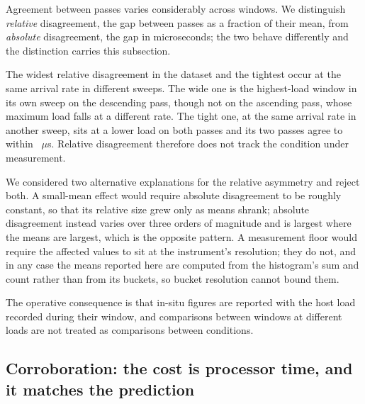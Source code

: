 \documentclass[pdflatex,sn-basic,twocolumn]{sn-jnl}%
\providecommand{\DIFaddbegin}{} %
\providecommand{\DIFaddend}{} %
\providecommand{\DIFdelbegin}{} %
\providecommand{\DIFdelend}{} %
\newcommand{\DIFscaledelfig}{0.5}
\newlength{\DIFdelgraphicswidth} %
\newlength{\DIFdelgraphicsheight} %
\newcommand{\DIFaddincludegraphics}[2][]{{\color{blue}\fbox{\DIFOincludegraphics[#1]{#2}}}} %
\newcommand{\DIFdelincludegraphics}[2][]{%
\sbox{\DIFdelgraphicsbox}{\DIFOincludegraphics[#1]{#2}}%
\settoboxwidth{\DIFdelgraphicswidth}{\DIFdelgraphicsbox} %
\settoboxtotalheight{\DIFdelgraphicsheight}{\DIFdelgraphicsbox} %
\scalebox{\DIFscaledelfig}{%
\parbox[b]{\DIFdelgraphicswidth}{\usebox{\DIFdelgraphicsbox}\\[-\baselineskip] \rule{\DIFdelgraphicswidth}{0em}}\llap{\resizebox{\DIFdelgraphicswidth}{\DIFdelgraphicsheight}{%
\setlength{\unitlength}{\DIFdelgraphicswidth}%
\begin{picture}(1,1)%
\thicklines\linethickness{2pt} %
{\color[rgb]{1,0,0}\put(0,0){\framebox(1,1){}}}%
{\color[rgb]{1,0,0}\put(0,0){\line( 1,1){1}}}%
{\color[rgb]{1,0,0}\put(0,1){\line(1,-1){1}}}%
\end{picture}%
}\hspace*{3pt}}} %
} %
\DeclareRobustCommand{\DIFaddbegin}{\DIFOaddbegin \let\includegraphics\DIFaddincludegraphics} %
\DeclareRobustCommand{\DIFaddend}{\DIFOaddend \let\includegraphics\DIFOincludegraphics} %
\DeclareRobustCommand{\DIFdelbegin}{\DIFOdelbegin \let\includegraphics\DIFdelincludegraphics} %
\DeclareRobustCommand{\DIFdelend}{\DIFOaddend \let\includegraphics\DIFOincludegraphics} %
\begin{document}
Agreement between passes varies considerably across windows. We distinguish
\emph{relative} disagreement, the gap between passes as a fraction of their mean,
from \emph{absolute} disagreement, the gap in microseconds; the two behave
differently and the distinction carries this subsection.

The widest relative disagreement in the dataset and the tightest occur at the same
arrival rate in different sweeps. The wide one is the highest-load window in its
own sweep on the descending pass, though not on the ascending pass, whose maximum
load falls at a different rate. The tight one, at the same arrival rate in another
sweep, sits at a lower load on both passes and its two passes agree to within
\InsituTightestAgreement~$\mu$s. Relative disagreement therefore does not track
the condition under measurement.

We considered two alternative explanations for the relative asymmetry and reject
both. A small-mean effect would require absolute disagreement to be roughly
constant, so that its relative size grew only as means shrank; absolute
disagreement instead varies over three orders of magnitude and is largest where
the means are largest, which is the opposite pattern. A measurement floor would
require the affected values to sit at the instrument's resolution; they do not,
and in any case the means reported here are computed from the histogram's sum and
count rather than from its buckets, so bucket resolution cannot bound them.

The operative consequence is that in-situ figures are reported with the host load
recorded during their window, and comparisons between windows at different loads
are not treated as comparisons between conditions.

\DIFdelbegin %
\DIFdelend \DIFaddbegin \subsection{Corroboration: the cost is processor time, and it matches the
prediction}\DIFaddend \label{sec:abcorroboration}
\end{document}
